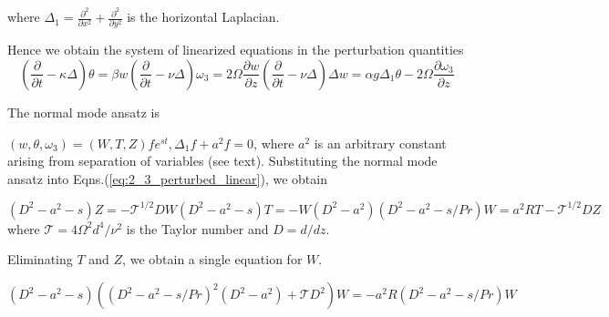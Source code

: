 where $\Delta_{1} = \frac{\partial^{2}}{\partial x^{2}} + \frac{\partial^{2}}{\partial y^{2}}$ is the horizontal Laplacian.

Hence we obtain the system of linearized equations in the perturbation quantities
\begin{subequations}\label{eq:2_3_perturbed_linear}
\begin{equation}
 \left(\frac{\partial }{\partial t} - \kappa \Delta \right) \theta = \beta w
 \end{equation}
 \begin{equation}
  \left(\frac{\partial }{\partial t} - \nu \Delta \right) \omega_{3} = 2\Omega\frac{\partial w}{\partial {z}}
 \end{equation}
  \begin{equation}
\left(\frac{\partial }{\partial t} - \nu \Delta \right) \Delta w = \alpha g \Delta_{1} \theta - 2 \Omega \frac{\partial \omega_{3}}{\partial z}
\end{equation}
\end{subequations}

The normal mode ansatz is

$(w, \theta, \omega_{3}) = (W, T, Z)f e^{st}, \Delta_{1} f + a^{2}f = 0$, where $a^{2}$ is an arbitrary constant arising from separation of variables (see text). Substituting the normal mode ansatz into Eqns.(\ref{eq:2_3_perturbed_linear}), we obtain

\begin{subequations}\label{eq:2_3_amplitude}
 \begin{equation}
  (D^{2}-a^{2}-s)Z = -\mathcal{T}^{1/2}DW
 \end{equation}
 
 \begin{equation}
  (D^{2}-a^{2}-s) T = -W
 \end{equation}
 
 \begin{equation}
  (D^{2}-a^{2})(D^{2}-a^{2}-s/Pr)W = a^{2}RT - \mathcal{T}^{1/2}DZ
 \end{equation}
\end{subequations}
where $\mathcal{T} = 4\Omega^{2}d^{4}/\nu^{2}$ is the Taylor number and $D = d/dz$.

Eliminating $T$ and $Z$, we obtain a single equation for $W$.

\begin{equation}\label{eq:rotating_RB_W_eqn}
 (D^{2}-a^{2}-s)\left( (D^{2}-a^{2}-s/Pr)^{2}(D^{2}-a^{2}) + \mathcal{T}D^{2}\right)W = -a^{2}R (D^{2}-a^{2}-s/Pr)W
\end{equation}

